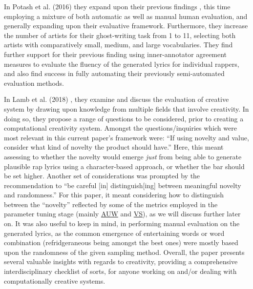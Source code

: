 In Potash et al. (2016) \cite{PotashPeter2016ECLG} they expand upon their previous findings \cite{potash-etal-2015-ghostwriter}, this time employing a mixture of both automatic as well as manual human evaluation, and generally expanding upon their evaluative framework. Furthermore, they increase the number of artists for their ghost-writing task from 1 to 11, selecting both artists with comparatively small, medium, and large vocabularies. They find further support for their previous finding using inner-annotator agreement measures to evaluate the fluency of the generated lyrics for individual rappers, and also find success in fully automating their previously semi-automated evaluation methods.

In Lamb et al. (2018) \cite{LambCarolyn2018ECCA}, they examine and discuss the evaluation of creative system by drawing upon knowledge from multiple fields that involve creativity. In doing so, they propose a range of questions to be considered, prior to creating a computational creativity system. Amongst the questions/inquiries which were most relevant in this current paper's framework were: “If using novelty and value, consider what kind of novelty the product should have.” Here, this meant assessing to whether the novelty would emerge \textit{just} from being able to generate plausible rap lyrics using a character-based approach, or whether the bar should be set higher. Another set of considerations was prompted by the recommendation to “be careful [in] distinguish[ing] between meaningful novelty and randomness.” For this paper, it meant considering how to distinguish between the “novelty” reflected by some of the metrics employed in the parameter tuning stage (mainly \hyperref[para:avg-unique-words/v]{AUW} and \hyperref[para:total-vocab-size]{VS}), as we will discuss further later on. It was also useful to keep in mind, in performing manual evaluation on the generated lyrics, as the common emergence of entertaining words or word combination (refridgeraneous being amongst the best ones) were mostly based upon the randomness of the given sampling method. Overall, the paper presents several valuable insights with regards to creativity, providing a comprehensive interdisciplinary checklist of sorts, for anyone working on and/or dealing with computationally creative systems.